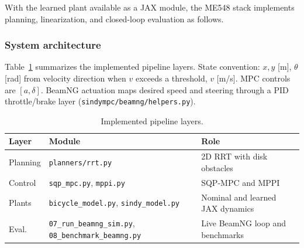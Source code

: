 \documentclass[letterpaper, 10 pt, conference]{ieeeconf}  %
\begin{document}
With the learned plant available as a JAX module, the ME548 stack implements planning, linearization, and closed-loop evaluation as follows.

\subsubsection{System architecture}
Table~\ref{tab:architecture} summarizes the implemented pipeline layers.
State convention: $x, y$ [m], $\theta$ [rad] from velocity direction when $v$ exceeds a threshold, $v$ [m/s].
MPC controls are $[a, \delta]$.
BeamNG actuation maps desired speed and steering through a PID throttle/brake layer (\texttt{sindympc/beamng/helpers.py}).





\begin{table}[t]
\centering
\caption{Implemented pipeline layers.}
\label{tab:architecture}

\begin{tabularx}{\columnwidth}{@{}p{1.0cm}p{3.5cm}X@{}}
\toprule
Layer & Module & Role \\
\midrule
Planning &
\texttt{planners/rrt.py} &
2D RRT with disk obstacles \\
Control &
\texttt{sqp\_mpc.py}, \texttt{mppi.py} &
SQP-MPC and MPPI \\
Plants &
\texttt{bicycle\_model.py}, \texttt{sindy\_model.py} &
Nominal and learned JAX dynamics \\
Eval. &
\texttt{07\_run\_beamng\_sim.py}, \texttt{08\_benchmark\_beamng.py} &
Live BeamNG loop and benchmarks \\
\bottomrule
\end{tabularx}

\end{table}
\end{document}
